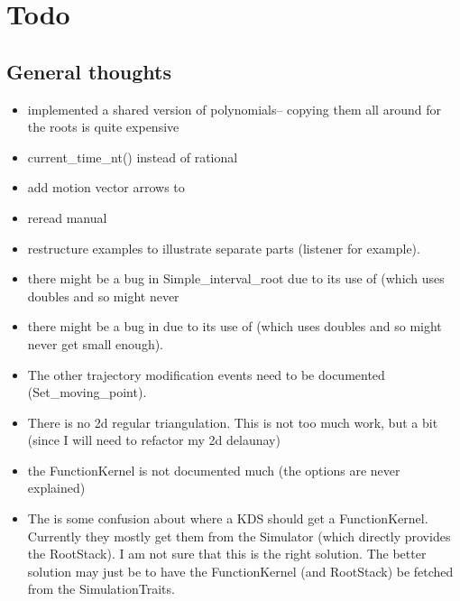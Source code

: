 \section{Todo}

\subsection{General thoughts}

\begin{itemize}

\item implemented a shared version of polynomials-- copying them all around for the roots is quite expensive

\item current\_time\_nt() instead of rational

\item add motion vector arrows to 

\item reread manual

\item restructure examples to illustrate separate parts (listener for example).

\item there might be a bug in Simple\_interval\_root due to its use of
   (which uses doubles and so might never

\item there might be a bug in  due to its use of
   (which uses doubles and so might never
  get small enough).

\item The other trajectory modification events need to be documented
  (Set\_moving\_point). 

\item There is no 2d regular triangulation. This is not too much work,
  but a bit (since I will need to refactor my 2d delaunay)

\item the FunctionKernel is not documented much (the options are never
  explained)

\item The is some confusion about where a KDS should get a
  FunctionKernel. Currently they mostly get them from the Simulator
  (which directly provides the RootStack). I am not sure that this is
  the right solution. The better solution may just be to have the
  FunctionKernel (and RootStack) be fetched from the SimulationTraits.


\end{itemize}
